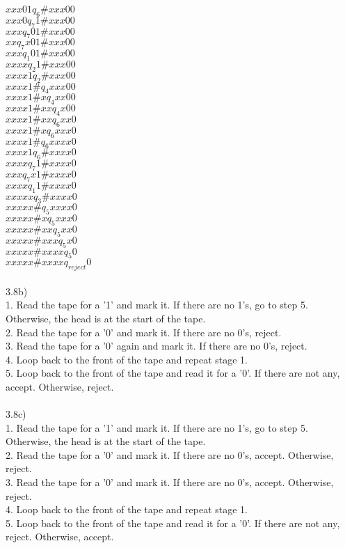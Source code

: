 \documentclass[11pt]{article}
\begin{document}
$x x x 0 1 q_6 \# x x x 0 0$\\
$x x x 0 q_7 1 \# x x x 0 0$\\
$x x x q_7 0 1 \# x x x 0 0$\\
$x x q_7 x 0 1 \# x x x 0 0$\\
$x x x q_1 0 1 \# x x x 0 0$\\
$x x x x q_2 1 \# x x x 0 0$\\
$x x x x 1 q_2 \# x x x 0 0$\\
$x x x x 1 \# q_4 x x x 0 0$\\
$x x x x 1 \# x q_4 x x 0 0$\\
$x x x x 1 \# x x q_4 x 0 0$\\
$x x x x 1 \# x x q_6 x x 0$\\
$x x x x 1 \# x q_6 x x x 0$\\
$x x x x 1 \# q_6 x x x x 0$\\
$x x x x 1 q_6 \# x x x x 0$\\
$x x x x q_7 1 \# x x x x 0$\\
$x x x q_7 x 1 \# x x x x 0$\\
$x x x x q_1 1 \# x x x x 0$\\
$x x x x x q_3 \# x x x x 0$\\
$x x x x x \# q_5 x x x x 0$\\
$x x x x x \# x q_5 x x x 0$\\
$x x x x x \# x x q_5 x x 0$\\
$x x x x x \# x x x q_5 x 0$\\
$x x x x x \# x x x x q_5 0$\\
$x x x x x \# x x x x q_{reject} 0$\\ \\

\noindent3.8b)\\
1. Read the tape for a '1' and mark it.  If there are no 1's, go to step 5.  Otherwise, the head is at the start of the tape. \\
2. Read the tape for a '0' and mark it.  If there are no 0's, reject. \\
3. Read the tape for a '0' again and mark it.  If there are no 0's, reject. \\
4. Loop back to the front of the tape and repeat stage 1. \\
5. Loop back to the front of the tape and read it for a '0'.  If there are not any, accept.  Otherwise, reject. \\ \\

\noindent 3.8c)\\
1. Read the tape for a '1' and mark it.  If there are no 1's, go to step 5.  Otherwise, the head is at the start of the tape. \\
2. Read the tape for a '0' and mark it.  If there are no 0's, accept.  Otherwise, reject. \\
3. Read the tape for a '0' and mark it.  If there are no 0's, accept.  Otherwise, reject. \\
4. Loop back to the front of the tape and repeat stage 1. \\
5. Loop back to the front of the tape and read it for a '0'.  If there are not any, reject.  Otherwise, accept. \\ \\
\end{document}
